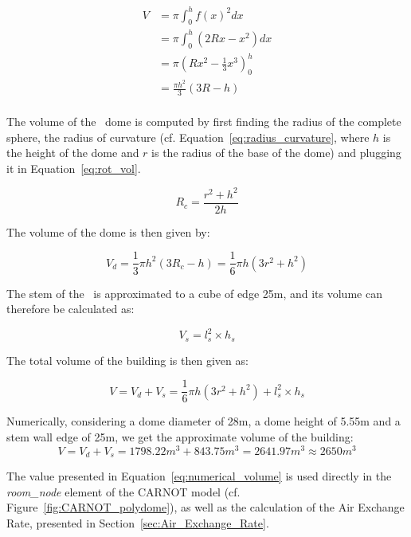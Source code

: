 \begin{equation}\label{eq:rot_vol}
    \begin{aligned}
        V &= \pi \int_0^h f(x)^2 dx \\
          &= \pi \int_0^h (2Rx - x^2)dx \\
          &= \pi \left( Rx^2 - \frac{1}{3}x^3 \right)_0^h \\
          &= \frac{\pi h^2}{3} (3R - h) \\
    \end{aligned}
\end{equation}

The volume of the \pdome\ dome is computed  by first finding the radius of the
complete sphere, the radius of curvature (cf.
Equation~\ref{eq:radius_curvature}, where $h$ is the height of the dome and $r$
is the radius of the base of the dome) and plugging it in
Equation~\ref{eq:rot_vol}.

\begin{equation}\label{eq:radius_curvature}
    R_c = \frac{r^2 + h^2}{2h}
\end{equation}

The volume of the dome is then given by: 

\begin{equation}
    V_d = \frac{1}{3} \pi h^2 (3R_c - h) = \frac{1}{6} \pi h (3r^2 + h^2)
\end{equation}

The stem of the \pdome\ is approximated to a cube of edge 25m, and its volume can
therefore be calculated as: 

\begin{equation}
    V_s = l_s^2 \times h_s
\end{equation}

The total volume of the building is then given as: 

\begin{equation}
    V = V_d + V_s = \frac{1}{6} \pi h (3r^2 + h^2) + l_s^2 \times h_s
\end{equation}

Numerically, considering a dome diameter of 28m, a dome height of 5.55m and a stem
wall edge of 25m, we get the approximate volume of the building:
\begin{equation}\label{eq:numerical_volume}
    V = V_d + V_s = 1798.22m^3 + 843.75m^3 = 2641.97m^3 \approx 2650m^3
\end{equation}

The value presented in Equation~\ref{eq:numerical_volume} is used directly in
the \textit{room\_node} element of the CARNOT model (cf.
Figure~\ref{fig:CARNOT_polydome}), as well as the calculation of the Air
Exchange Rate, presented in Section~\ref{sec:Air_Exchange_Rate}.

